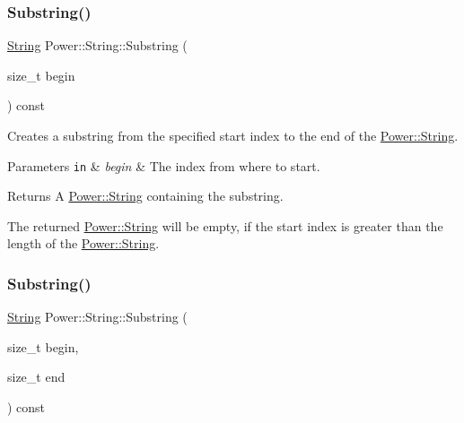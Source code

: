 \subsubsection{\texorpdfstring{Substring()}{Substring()}\hspace{0.1cm}{\footnotesize\ttfamily [1/2]}}
{\footnotesize\ttfamily \hyperlink{class_power_1_1_string}{String} Power\+::\+String\+::\+Substring (\begin{DoxyParamCaption}\item[{size\+\_\+t}]{begin }\end{DoxyParamCaption}) const\hspace{0.3cm}{\ttfamily [inline]}}



Creates a substring from the specified start index to the end of the \hyperlink{class_power_1_1_string}{Power\+::\+String}. 


\begin{DoxyParams}[1]{Parameters}
\mbox{\tt in}  & {\em begin} & The index from where to start. \\
\hline
\end{DoxyParams}
\begin{DoxyReturn}{Returns}
A \hyperlink{class_power_1_1_string}{Power\+::\+String} containing the substring. 

The returned \hyperlink{class_power_1_1_string}{Power\+::\+String} will be empty, if the start index is greater than the length of the \hyperlink{class_power_1_1_string}{Power\+::\+String}. 
\end{DoxyReturn}
\mbox{\label{class_power_1_1_string_a648cd16b1af13b87a20d623d933f067c}} 
\subsubsection{\texorpdfstring{Substring()}{Substring()}\hspace{0.1cm}{\footnotesize\ttfamily [2/2]}}
{\footnotesize\ttfamily \hyperlink{class_power_1_1_string}{String} Power\+::\+String\+::\+Substring (\begin{DoxyParamCaption}\item[{size\+\_\+t}]{begin,  }\item[{size\+\_\+t}]{end }\end{DoxyParamCaption}) const\hspace{0.3cm}{\ttfamily [inline]}}



